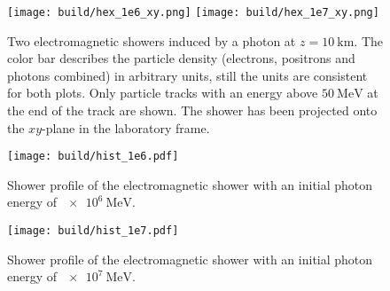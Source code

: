 \begin{figure}
      \centering
        {\texttt{[image: build/hex\_1e6\_xy.png]}}
        \hfill
        {\texttt{[image: build/hex\_1e7\_xy.png]}}
      \caption{Two electromagnetic showers induced by a photon at $z=\SI{10}{\kilo\metre}$. The color bar describes the particle density (electrons, positrons and photons combined) in arbitrary units, still the units are consistent for both plots. Only particle tracks with an energy above $\SI{50}{\mega\electronvolt}$ at the end of the track are shown. The shower has been projected onto the $xy$-plane in the laboratory frame.\label{fig:hex_xy}}
\end{figure}

\begin{figure}
    \centering
    \texttt{[image: build/hist\_1e6.pdf]}
    \caption{Shower profile of the electromagnetic shower with an initial photon energy of $\SI{e6}{\mega\electronvolt}$.}
    \label{fig:hist_1e6}
\end{figure}

\begin{figure}
    \centering
    \texttt{[image: build/hist\_1e7.pdf]}
    \caption{Shower profile of the electromagnetic shower with an initial photon energy of $\SI{e7}{\mega\electronvolt}$.}
    \label{fig:hist_1e7}
\end{figure}
